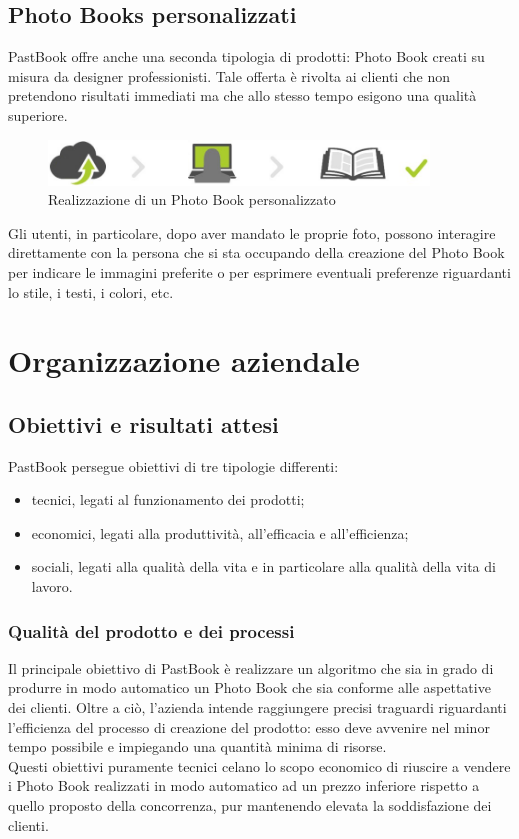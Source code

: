 		\subsection{Photo Books personalizzati}
			PastBook offre anche una seconda tipologia di prodotti: Photo Book creati su misura da designer professionisti. Tale offerta
			è rivolta ai clienti che non pretendono risultati immediati ma che allo stesso tempo esigono una qualità superiore.
			\begin{figure}[H]
				\centering
				\includegraphics[width=0.9\textwidth]{capitolo_1/immagini/photo_book_personalizzato.png}
				\caption[Realizzazione di un Photo Book personalizzato]{Realizzazione di un Photo Book personalizzato\protect\footnotemark}
			\end{figure}
			\noindent Gli utenti, in particolare, dopo aver mandato le proprie foto, possono interagire direttamente con la persona che
			si sta occupando della creazione del Photo Book per indicare le immagini preferite o per esprimere eventuali preferenze
			riguardanti lo stile, i testi, i colori, etc.
	\section{Organizzazione aziendale}
		\subsection{Obiettivi e risultati attesi}
			PastBook persegue obiettivi di tre tipologie differenti:
			\begin{itemize}
				\item tecnici, legati al funzionamento dei prodotti;
				\item economici, legati alla produttività, all'efficacia e all'efficienza;
				\item sociali, legati alla qualità della vita e in particolare alla qualità della vita di lavoro.
			\end{itemize}
			\subsubsection{Qualità del prodotto e dei processi}
				Il principale obiettivo di PastBook è realizzare un algoritmo che sia in grado di produrre in modo
				automatico un Photo Book che sia conforme alle aspettative dei clienti. Oltre a ciò, l'azienda intende raggiungere
				precisi traguardi riguardanti l'efficienza del processo di creazione del prodotto: esso deve avvenire nel minor tempo
				possibile e impiegando una quantità minima di risorse.\\
				Questi obiettivi puramente tecnici celano lo scopo economico di riuscire a vendere i Photo Book realizzati in modo
				automatico ad un prezzo inferiore rispetto a quello proposto della concorrenza, pur mantenendo elevata la
				soddisfazione dei clienti.
